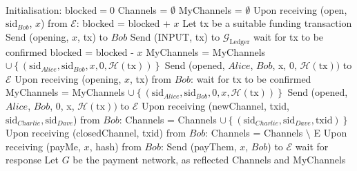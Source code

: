 \ \\ 
  \label{alg:lightningprot}
  \begin{algorithmic}[1]
    \State Initialisation:
      \State $\mathrm{blocked} = 0$
      \State Channels = $\emptyset$
      \State MyChannels = $\emptyset$
    \State
    \State Upon receiving (open, $\mathrm{sid}_{Bob}$, $x$) from $\mathcal{E}$:
        \State blocked = blocked + $x$
        \State Let tx be a suitable funding transaction
        \State Send (opening, $x$, tx) to $Bob$
        \State Send (INPUT, tx) to $\mathcal{G}_{\mathrm{Ledger}}$
        \State wait for tx to be confirmed 
        \State blocked = blocked - $x$
        \State MyChannels = MyChannels $\cup \left\{\left(\mathrm{sid}_{Alice},
        \mathrm{sid}_{Bob}, x, 0, \mathcal{H}\left(\mathrm{tx}\right)\right)\right\}$
        \State Send (opened, $Alice$, $Bob$, x, 0, $\mathcal{H}\left(\mathrm{tx}\right))$
        to $\mathcal{E}$
      \EndIf
    \State
    \State Upon receiving (opening, $x$, tx) from $Bob$:
      \State wait for tx to be confirmed
      \State MyChannels = MyChannels $\cup \left\{\left(\mathrm{sid}_{Alice},
      \mathrm{sid}_{Bob}, 0, x, \mathcal{H}\left(\mathrm{tx}\right)\right)\right\}$
      \State Send (opened, $Alice$, $Bob$, 0, x, $\mathcal{H}\left(\mathrm{tx}\right))$ to
      $\mathcal{E}$
    \State
    \State Upon receiving (newChannel, txid, $\mathrm{sid}_{Charlie},
    \mathrm{sid}_{Dave}$) from $Bob$:
        \State Channels = Channels $\cup \left\{\left(\mathrm{sid}_{Charlie},
        \mathrm{sid}_{Dave}, \mathrm{txid}\right)\right\}$
      \EndIf
    \State
    \State Upon receiving (closedChannel, txid) from $Bob$:
        \State Channels = Channels $\setminus$ E
      \EndIf
    \State
    \State Upon receiving (payMe, $x$, hash) from $Bob$:
      \State Send (payThem, $x$, $Bob$) to $\mathcal{E}$
      \State wait for response
        \State Let $G$ be the payment network, as reflected Channels and MyChannels
\end{algorithmic}
